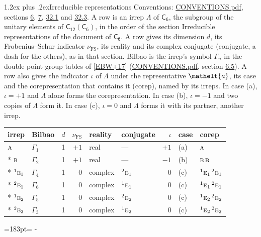 \documentclass[10pt,a4paper]{article}
\makeatletter
\renewcommand\section{\@startsection{section}{1}{\z@}{-3ex plus -1ex minus -.2ex}%
  {1.2ex plus .2ex}{\normalfont\large\sffamily\bfseries\color{parttitle}}}
\newcommand{\needspace}[1]{\par\penalty-100\begingroup\dimen0=#1\relax\dimen2=\pagegoal
  \advance\dimen2-\pagetotal\ifdim\dimen0>\dimen2\relax\ifdim\dimen2>0pt\vfil\break\fi\fi
  \endgroup}
\numberwithin{equation}{section}
\newcommand{\eltfont}[1]{{\let\sigma\eltsigma\mathelt{#1}}}
\newcommand{\grp}[1]{\mathsf{#1}}
\newcommand{\irr}[1]{\text{\normalfont\scshape #1}}
\newcommand{\conjpair}[1]{{}^{#1}}
\newcommand{\elt}[1]{\eltfont{#1}}
\newcommand{\fsind}{\nu_{\mathrm{FS}}}
\makeatother
\begin{document}
\section{Irreducible representations}\label{s:irreps}
Conventions: \href{../../CONVENTIONS.pdf}{CONVENTIONS.pdf}, sections \href{../../../rotation/CONVENTIONS.pdf\#conv.6}{6}, \href{../../../rotation/CONVENTIONS.pdf\#conv.7}{7}, \href{../../CONVENTIONS.pdf\#conv.32.1}{32.1} and \href{../../CONVENTIONS.pdf\#conv.32.3}{32.3}.
\leavevmode\label{n:irrep.Delta}A row is an irrep $\Lambda$ of $\grp{C_{6}}$, the subgroup of the unitary elements of $\grp{C_{12}}(\grp{C_{6}})$, in the order of the section Irreducible representations of the document of \href{../../../rotation/data/pdf/C6.pdf}{$\grp{C_{6}}$}. \label{n:index.dimension}\label{n:index.frobenius}\label{n:head.irrep}\label{n:head.reality}\label{n:head.conjugate}A row gives its dimension $d$, its Frobenius--Schur indicator $\fsind$, its reality and its complex conjugate (conjugate, a dash for the others), as in that section. \label{n:head.bilbao}\label{n:irrep.alias.gamma}Bilbao is the irrep's symbol $\Gamma_n$ in the double point group tables of [\href{../../../REFERENCES.pdf\#ref.EBW+17}{EBW+17}] (\href{../../CONVENTIONS.pdf}{CONVENTIONS.pdf}, section \href{../../../rotation/CONVENTIONS.pdf\#conv.6.5}{6.5}). \label{n:head.case.corep}\label{n:head.corep}A row also gives the indicator $\iota$ of $\Lambda$ under the representative $\elt{a}$, its case and the corepresentation that contains it (corep), named by its irreps. In case (a), $\iota = +1$ and $\Lambda$ alone forms the corepresentation. In case (b), $\iota = -1$ and two copies of $\Lambda$ form it. In case (c), $\iota = 0$ and $\Lambda$ forms it with its partner, another irrep.
\setlength{\emergencystretch}{2em}\par\setlength{\emergencystretch}{0pt}
{\small\renewcommand{\arraystretch}{1.25}\setlength{\tabcolsep}{4pt}\begin{longtable}{@{}llrrllrll@{}}\toprule
irrep & Bilbao & $d$ & $\fsind$ & reality & conjugate & $\iota$ & case & corep\\\midrule\endhead
\bottomrule\endfoot\endlastfoot
$\irr{a}$ & $\Gamma_{1}$ & 1 & $+1$ & real & --- & $+1$ & (a) & $\irr{a}$\\*
$\irr{b}$ & $\Gamma_{2}$ & 1 & $+1$ & real & --- & $-1$ & (b) & $\irr{b}\,\irr{b}$\\*
$\conjpair{1}\irr{e}_{1}$ & $\Gamma_{4}$ & 1 & $0$ & complex & $\conjpair{2}\irr{e}_{1}$ & $0$ & (c) & $\conjpair{1}\irr{e}_{1}\,\conjpair{2}\irr{e}_{1}$\\*
$\conjpair{2}\irr{e}_{1}$ & $\Gamma_{6}$ & 1 & $0$ & complex & $\conjpair{1}\irr{e}_{1}$ & $0$ & (c) & $\conjpair{1}\irr{e}_{1}\,\conjpair{2}\irr{e}_{1}$\\*
$\conjpair{1}\irr{e}_{2}$ & $\Gamma_{5}$ & 1 & $0$ & complex & $\conjpair{2}\irr{e}_{2}$ & $0$ & (c) & $\conjpair{1}\irr{e}_{2}\,\conjpair{2}\irr{e}_{2}$\\*
$\conjpair{2}\irr{e}_{2}$ & $\Gamma_{3}$ & 1 & $0$ & complex & $\conjpair{1}\irr{e}_{2}$ & $0$ & (c) & $\conjpair{1}\irr{e}_{2}\,\conjpair{2}\irr{e}_{2}$\\
\bottomrule\end{longtable}}
\needspace{183pt}
\end{document}
